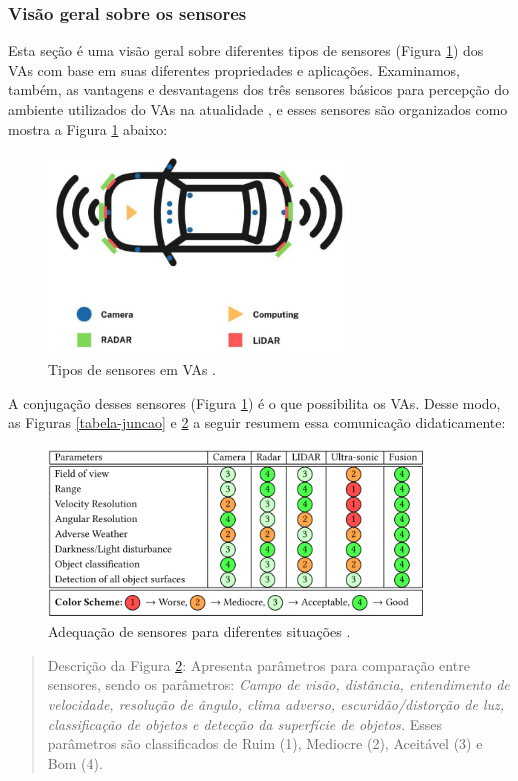  

\subsubsection{Visão geral sobre os sensores}

Esta seção é uma visão geral sobre diferentes tipos de sensores (Figura \ref{figura-sensores}) dos VAs com base em suas diferentes propriedades e aplicações. Examinamos, também, as vantagens e desvantagens dos três sensores básicos para percepção do ambiente utilizados do VAs na atualidade \cite{sensors}, e esses sensores são organizados como mostra a Figura \ref{figura-sensores} abaixo:


\begin{figure}[H]
\centering
\includegraphics[width=8cm]{Figures/sensores.png}
\caption{Tipos de sensores em VAs \cite{review-auto}.}
\label{figura-sensores}
\end{figure}


A conjugação desses sensores (Figura \ref{figura-sensores}) é o que possibilita os VAs. Desse modo, as Figuras \ref{tabela-juncao} e \ref{all-sense} a seguir resumem essa comunicação didaticamente:

\begin{figure}[H]
\centering
\includegraphics[width=10cm]{Figures/all-sense.png}
\caption{Adequação de sensores para diferentes situações \cite{sensors-yet}.}
\label{all-sense}
\end{figure}
\begin{quote}
Descrição da Figura \ref{all-sense}: Apresenta parâmetros para comparação entre sensores, sendo os parâmetros: \textit{Campo de visão, distância, entendimento de velocidade, resolução de ângulo, clima adverso, escuridão/distorção de luz, classificação de objetos e detecção da superfície de objetos.} Esses parâmetros são classificados de Ruim (1), Mediocre (2), Aceitável (3) e Bom (4).
\end{quote}


